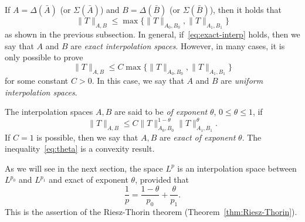 If $A=\Delta(\bar{A})$ (or $\Sigma(\bar{A})$) and $B=\Delta(\bar{B})$ (or $\Sigma(\bar{B})$), then it holds that
\begin{equation}
\label{eq:exact-interp}
    \|T\|_{A,B} \le \max\{\|T\|_{A_0,B_0}, \|T\|_{A_1,B_1}\}
\end{equation}
as shown in the previous subsection. In general, if~\eqref{eq:exact-interp} holds, then we say that $A$ and $B$ are \emph{exact interpolation spaces}. However, in many cases, it is only possible to prove
\begin{equation}
\label{eq:unif-interp}
    \|T\|_{A,B} \le C\max\{\|T\|_{A_0,B_0}, \|T\|_{A_1,B_1}\}
\end{equation}
for some constant $C>0$. In this case, we say that $A$ and $B$ are \emph{uniform interpolation spaces}.

The interpolation spaces $A,B$ are said to be \emph{of exponent} $\theta$, $0\le\theta\le 1$, if 
\begin{equation}
\label{eq:theta}
    \|T\|_{A,B} \le C\|T\|^{1-\theta}_{A_0,B_0}\|T\|^\theta_{A_1,B_1}.
\end{equation}
If $C=1$ is possible, then we say that $A,B$ are \emph{exact of exponent} $\theta$. The inequality~\ref{eq:theta} is a convexity result.
\begin{example}
As we will see in the next section, the space $L^p$ is an interpolation space between $L^{p_0}$ and $L^{p_1}$ and exact of exponent $\theta$, provided that
\begin{equation*}
    \frac{1}{p} = \frac{1-\theta}{p_0} + \frac{\theta}{p_1}.
\end{equation*}
This is the assertion of the Riesz-Thorin theorem (Theorem~\ref{thm:Riesz-Thorin}).
\end{example}

